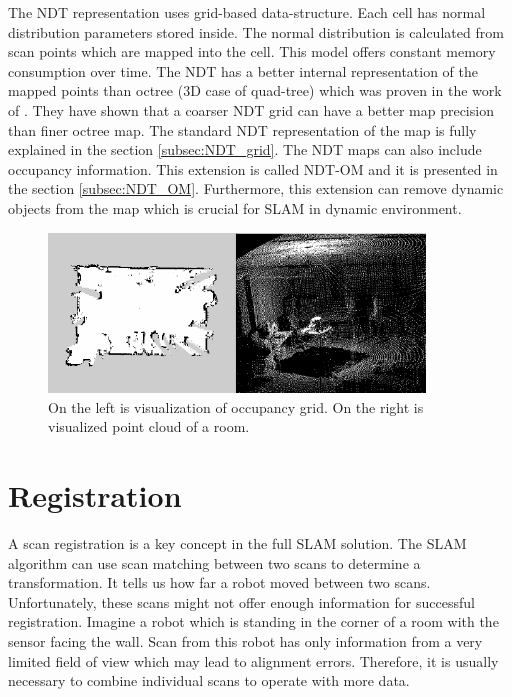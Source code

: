 The \gls{NDT} representation \cite{Biber03} uses grid-based data-structure. Each cell has normal distribution parameters stored inside. The normal distribution is calculated from scan points which are mapped into the cell. This model offers constant memory consumption over time. The \gls{NDT} has a better internal representation of the mapped points than octree (3D case of quad-tree) which was proven in the work of \cite{Saarinen13}. They have shown that a coarser \gls{NDT} grid can have a better map precision than finer octree map. The standard \gls{NDT} representation of the map is fully explained in the section \ref{subsec:NDT_grid}. The \gls{NDT} maps can also include occupancy information. This extension is called \gls{NDT-OM} and it is presented in the section \ref{subsec:NDT_OM}. Furthermore, this extension can remove dynamic objects from the map which is crucial for \gls{SLAM} in dynamic environment.      
\begin{figure}
	\centering
	\includegraphics[width=100mm]{../img/maps.png}
	\caption{On the left is visualization of occupancy grid. On the right is visualized point cloud of a room.}
	\label{fig:maps}
\end{figure}
\newpage

\section{Registration}
\label{sec:Scan_reg}

A scan registration is a key concept in the full \gls{SLAM} solution. The \gls{SLAM} algorithm can use scan matching between two scans to determine a transformation. It tells us how far a robot moved between two scans. Unfortunately, these scans might not offer enough information for successful registration. Imagine a robot which is standing in the corner of a room with the sensor facing the wall. Scan from this robot has only information from a very limited field of view which may lead to alignment errors. Therefore, it is usually necessary to combine individual scans to operate with more data.  

